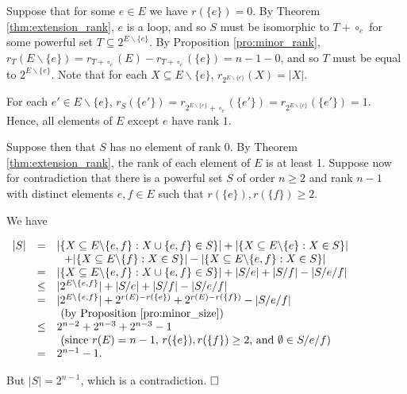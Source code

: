 \documentclass[10pt]{article}
\theoremstyle{definition}
\begin{document}
 

 
 
 Suppose that for some $e\in E$ we have $r(\{e\})=0$. By Theorem \ref{thm:extension_rank}, $e$ is a loop, and so $S$ must be isomorphic to $T+\circ_e$ for some powerful set $T\subseteq 2^{E\backslash\{e\}}$.  By Proposition \ref{pro:minor_rank}, $r_T(E\backslash\{e\})=r_{{T+\circ_e}}(E)-r_{{T+\circ_e}}(\{e\})=n-1-0$, and so $T$ must be equal to $2^{E\backslash\{e\}}$. Note that for each $X\subseteq E\backslash \{e\}$, $r_{2^{E\backslash\{e\}}}(X)=|X|$.
 
For each $e'\in E\backslash\{e\}$,   $r_S(\{e'\})=r_{2^{E\backslash\{ e\}}+\circ_e}(\{e'\})=r_{2^{E\backslash\{ e\}}}(\{e'\})=1$. Hence, all elements of $E$ except $e$ have rank $1$. 

Suppose then that $S$ has no element of rank 0. By Theorem \ref{thm:extension_rank}, the rank of each element of $E$ is at least 1.  Suppose now for contradiction that there is a powerful set $S$ of order $n\geq 2$ and rank $n-1$ with distinct elements $e,f \in E$ such that $r(\{e\}),r(\{f\})\geq 2$. 
 
 We have
 
 \begin{center}

 $ \begin{array}{llll}
|S| &   =& |\{X\subseteq E\backslash\{e,f\}:X\cup\{e,f\}\in S\}|+|\{X\subseteq E\backslash\{e\}:X\in S\}|\\  &&~~+|\{X\subseteq E\backslash\{f\}:X\in S\}|-|\{X\subseteq E\backslash\{e,f\}:X\in S\}|              \\
    &   =& |\{X\subseteq E\backslash\{e,f\}:X\cup\{e,f\}\in S\}| +|S/e|+|S/f|-|S/e/f|    \\
    &   \leq& |2^{E\backslash\{e,f\}}| +|S/e|+|S/f|-|S/e/f|    \\
    &   = &|2^{E\backslash\{e,f\}}| +2^{r(E)-r(\{e\})}+2^{r(E)-r(\{f\})}-|S/e/f|    \\
    & &~\hbox{(by Proposition \ref{pro:minor_size})}\\
    &   \leq&  2^{n-2}+2^{n-3}+2^{n-3}-1\\
    &  &~\hbox{(since $r(E)=n-1$, $r(\{e\}),r(\{f\})\geq 2$, and $\emptyset\in S/e/f$)}\\
 & =& 2^{n-1}-1.
\end{array}$
\end{center}

But $|S|=2^{n-1}$, which is a contradiction. $\hfill\Box$
 
\vspace{5mm}
\end{document}
